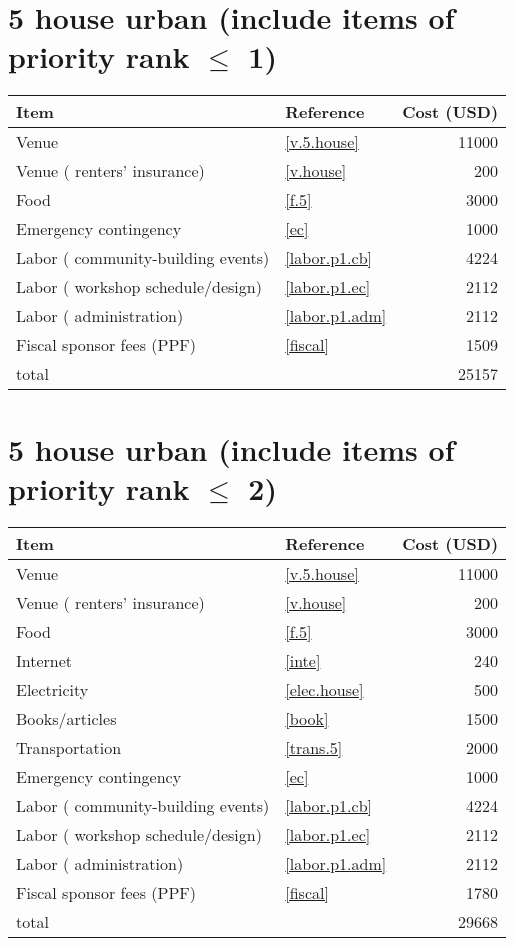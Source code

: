 \section*{5 house urban (include items of priority rank $\leq$ 1)}
\begin{center}
\begin{tabular}{llr}
Item & Reference & Cost (USD) \\ \hline
Venue & \ref{v.5.house} & 11000 \\
Venue ( renters' insurance) & \ref{v.house} & 200 \\
Food & \ref{f.5} & 3000 \\
Emergency contingency & \ref{ec} & 1000 \\
Labor ( community-building events) & \ref{labor.p1.cb} & 4224 \\
Labor ( workshop schedule/design) & \ref{labor.p1.ec} & 2112 \\
Labor ( administration) & \ref{labor.p1.adm} & 2112 \\
Fiscal sponsor fees (PPF) & \ref{fiscal} & 1509 \\ \hline
total &  & 25157
\end{tabular}
\end{center}
\newpage
\section*{5 house urban (include items of priority rank $\leq$ 2)}
\begin{center}
\begin{tabular}{llr}
Item & Reference & Cost (USD) \\ \hline
Venue & \ref{v.5.house} & 11000 \\
Venue ( renters' insurance) & \ref{v.house} & 200 \\
Food & \ref{f.5} & 3000 \\
Internet & \ref{inte} & 240 \\
Electricity & \ref{elec.house} & 500 \\
Books/articles & \ref{book} & 1500 \\
Transportation & \ref{trans.5} & 2000 \\
Emergency contingency & \ref{ec} & 1000 \\
Labor ( community-building events) & \ref{labor.p1.cb} & 4224 \\
Labor ( workshop schedule/design) & \ref{labor.p1.ec} & 2112 \\
Labor ( administration) & \ref{labor.p1.adm} & 2112 \\
Fiscal sponsor fees (PPF) & \ref{fiscal} & 1780 \\ \hline
total &  & 29668
\end{tabular}
\end{center}
\newpage
